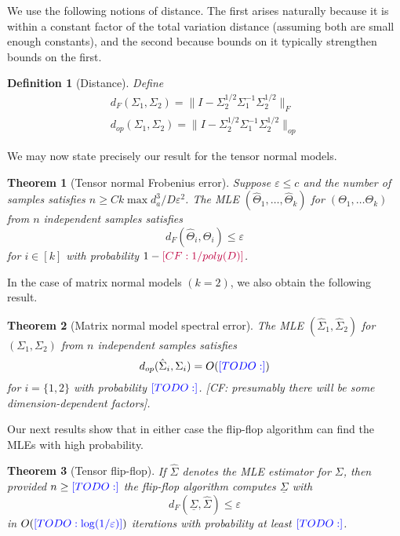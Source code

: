 \documentclass{article}
\newtheorem{theorem}{Theorem}
\newtheorem{definition}{Definition}
\newcommand\eps{\varepsilon}
\newcommand{\CF}[1]{{\color{purple}[CF: #1]}}
\newcommand{\TODO}[1]{{\color{blue}[TODO: #1]}}
\begin{document}
We use the following notions of distance. The first arises naturally because it is within a constant factor of the total variation distance (assuming both are small enough constants), and the second because bounds on it typically strengthen bounds on the first. 

\begin{definition}[Distance]
Define 
\begin{align}d_{F}(\Sigma_1, \Sigma_2) = \| I - \Sigma_2^{1/2} \Sigma_1^{-1} \Sigma_2^{1/2}\|_F\\
d_{op}(\Sigma_1, \Sigma_2) = \| I - \Sigma_2^{1/2} \Sigma_1^{-1} \Sigma_2^{1/2}\|_{op}
\end{align}
\end{definition}

We may now state precisely our result for the tensor normal models.

\begin{theorem}[Tensor normal Frobenius error]\label{thm:tensor-frobenius} Suppose $\eps \leq c$ and the number of samples satisfies $n \geq C k \max d_{a}^3/D\eps^2$. The MLE $(\widehat{\Theta}_1, \dots, \widehat{\Theta}_k) $ for $(\Theta_1, \dots \Theta_k)$ from $n$ independent samples satisfies 
$$ d_{F}(\widehat{\Theta}_i, \Theta_i) \leq \eps $$
for $i \in [k]$ with probability $1 - \CF{1/poly(D)}$.
\end{theorem}

In the case of matrix normal models $(k=2)$, we also obtain the following result.

\begin{theorem}[Matrix normal model spectral error]\label{thm:matrix-normal} The MLE $(\hat{\Sigma}_1,\hat{\Sigma}_2) $ for $(\Sigma_1, \Sigma_2)$ from $n$ independent samples satisfies 
$$ d_{op}(\hat{\Sigma}_i, \Sigma_i) = O(\TODO{}) $$
for $i = \{1,2\}$ with probability $\TODO{}$.
\CF{presumably there will be some dimension-dependent factors}.
\end{theorem}

Our next results show that in either case the flip-flop algorithm can find the MLEs with high probability.

\begin{theorem}[Tensor flip-flop]\label{thm:tensor-flipflop} If $\hat{\Sigma}$ denotes the MLE estimator for $\Sigma$, then provided $n \geq \TODO{}$ the flip-flop algorithm computes $\underline{\Sigma}$ with 
$$ d_F(\underline{\Sigma}, \hat{\Sigma}) \leq \eps $$
in $O(\TODO{\log(1/\eps)})$ iterations with probability at least $\TODO{}$.
\end{theorem}
\end{document}
